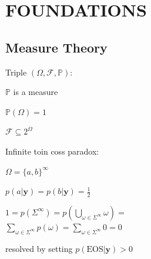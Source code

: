 \section{FOUNDATIONS}
\subsection{Measure Theory}

 Triple \((\Omega, \mathcal{F}, \mathbb{P})\):\\
\begin{enumerate*}[label=\textbullet, itemjoin={\quad}]
    \item \(\mathbb{P}\) is a measure
    \item \(\mathbb{P}(\Omega) = 1\)
    \item \(\mathcal{F} \subseteq 2^\Omega\)
\end{enumerate*}

\example Infinite toin coss paradox:\\
\begin{enumerate*}[label=\textbullet, itemjoin={\quad}]
    \item \(\Omega = \{a, b\}^\infty\)
    \item $p(a|\mathbf{y})=p(b|\mathbf{y}) = \frac{1}{2}$
    \item $1=p(\Sigma^\infty)=p(\bigcup_{\omega\in\Sigma^\infty}\omega)=$\\
    $\sum_{\omega\in\Sigma^\infty}p(\omega)=\sum_{\omega\in\Sigma^\infty}0 = 0$
    \item resolved by setting $p(\text{EOS}|\mathbf{y})>0$
\end{enumerate*}

